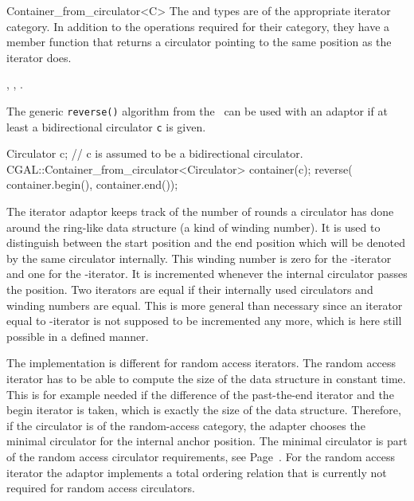 \begin{ccRefClass}{Container_from_circulator<C>}
The  and  types are of the
appropriate iterator category. In addition to the operations required
for their category, they have a member function
 that returns a circulator pointing to the
same position as the iterator does.

\ccSeeAlso

, 
,
.

\ccExample

The generic {\tt reverse()} algorithm from the \stl\ can be used with an
adaptor if at least a bidirectional circulator {\tt c} is given.

\begin{ccExampleCode}
Circulator c;  // c is assumed to be a bidirectional circulator.
CGAL::Container_from_circulator<Circulator> container(c);
reverse( container.begin(), container.end());
\end{ccExampleCode}

\ccImplementation

The iterator adaptor keeps track of the number of rounds a circulator
has done around the ring-like data structure (a kind of winding
number). It is used to distinguish between the start position and the
end position which will be denoted by the same circulator internally.
This winding number is zero for the -iterator and one
for the -iterator.  It is incremented whenever the
internal circulator passes the  position. Two
iterators are equal if their internally used circulators and winding
numbers are equal. 
This is more general than necessary since an iterator equal to
-iterator is not supposed to be incremented 
 any more, which is here still possible in a defined manner. 

The implementation is different for random access iterators.
The random access iterator has to be able to compute the size of the
data structure in constant time. This is for example needed if the
difference of the past-the-end iterator and the begin iterator is
taken, which is exactly the  size of the data structure.
Therefore, if the circulator is of the random-access category, the
adapter chooses the minimal circulator for the internal anchor
position. The minimal circulator is part of the random access
circulator requirements, see
Page~\pageref{sectionMinCircleRequ}.  For the random
access iterator the adaptor implements a total ordering relation that
is currently not required for random access circulators.

\end{ccRefClass}

